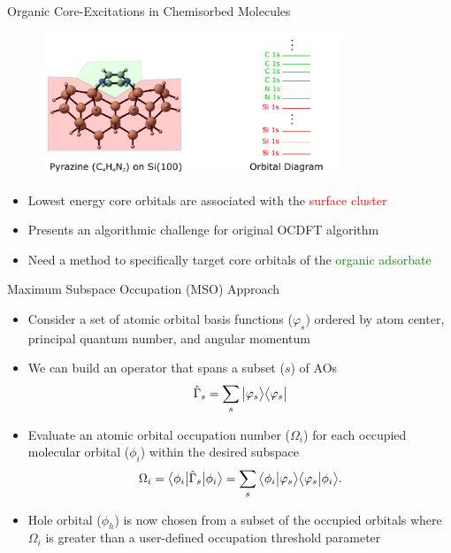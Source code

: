 \documentclass[t]{beamer}
\newcommand{\bra}[2][0]
{\ifthenelse{\equal{#1}{0}}{\left\langle #2 \right|}
{\ifthenelse{\equal{#1}{1}}{\big\langle #2 \big|}
{\ifthenelse{\equal{#1}{2}}{\Big\langle #2 \Big|}
{\ifthenelse{\equal{#1}{3}}{\bigg\langle #2 \bigg|}
{\ifthenelse{\equal{#1}{4}}{\Bigg\langle #2 \Bigg|}
{Error}}}}}
}
\newcommand{\braket}[3][0]
{\ifthenelse{\equal{#1}{0}}{\left\langle #2 \middle| #3 \right\rangle}
{\ifthenelse{\equal{#1}{1}}{\big\langle #2 \big| #3 \big\rangle}
{\ifthenelse{\equal{#1}{2}}{\Big\langle #2 \Big| #3 \Big\rangle}
{\ifthenelse{\equal{#1}{3}}{\bigg\langle #2 \bigg| #3 \bigg\rangle}
{\ifthenelse{\equal{#1}{4}}{\Bigg\langle #2 \Bigg| #3 \Bigg\rangle}
{Error}}}}}
}
\newcommand{\ket}[2][0]
{\ifthenelse{\equal{#1}{0}}{\left| #2 \right\rangle}
{\ifthenelse{\equal{#1}{1}}{\big| #2 \big\rangle}
{\ifthenelse{\equal{#1}{2}}{\Big| #2 \Big\rangle}
{\ifthenelse{\equal{#1}{3}}{\bigg| #2 \bigg\rangle}
{\ifthenelse{\equal{#1}{4}}{\Bigg| #2 \Bigg\rangle}
{Error}}}}}
}
\begin{document}
\begin{frame}{Organic Core-Excitations in Chemisorbed Molecules}
\begin{figure}
\includegraphics[width=0.8\textwidth]{pyrazine_si_100_slide_3.pdf}
\end{figure}
\begin{itemize}
\item Lowest energy core orbitals are associated with the \textcolor{red}{surface cluster}
\item Presents an algorithmic challenge for original OCDFT algorithm
\item Need a method to specifically target core orbitals of the \textcolor{green}{organic adsorbate}
\end{itemize}
\end{frame}

\begin{frame}{Maximum Subspace Occupation (MSO) Approach}
\begin{itemize}
\item Consider a set of atomic orbital basis functions ($\varphi_{s}$) ordered by atom center, principal quantum number, and angular momentum
\item We can build an operator that spans a subset ($s$) of AOs
\begin{equation}
\hat{\Gamma}_{s} = \sum_{s}\ket[1]{\varphi_{s}}\bra[1]{\varphi_{s}}
\end{equation}
\item Evaluate an atomic orbital occupation number ($\Omega_i$) for each occupied molecular orbital ($\phi_i$) within the desired subspace
\begin{equation}
\Omega_i = \bra[1]{\phi_i} \hat{\Gamma}_{s} \ket[1]{\phi_i} = \sum_{s} \braket[1]{\phi_i}{\varphi_{s}}\braket[1]{\varphi_{s}}{\phi_i}.
\end{equation}
\item Hole orbital ($\phi_h$) is now chosen from a subset of the occupied orbitals where $\Omega_i$ is greater than a user-defined occupation threshold parameter
\end{itemize}
\end{frame}
\end{document}

